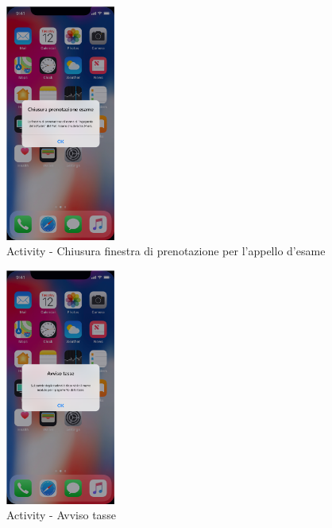 \begin{figure}
	\centering
	\includegraphics[width=0.32\textwidth]{imgs/gruppo2/activity-notifiche-chiusura-prenotazione-esame}
	\caption{Activity - Chiusura finestra di prenotazione per l'appello d'esame}
	\label{fig:activity-notifiche-chiusura-finestra-esame}
\end{figure}

\begin{figure}
	\centering
	\includegraphics[width=0.32\textwidth]{imgs/gruppo2/activity-notifiche-avviso-tasse}
	\caption{Activity - Avviso tasse}
	\label{fig:activity-notifiche-avviso-tasse}
\end{figure}

